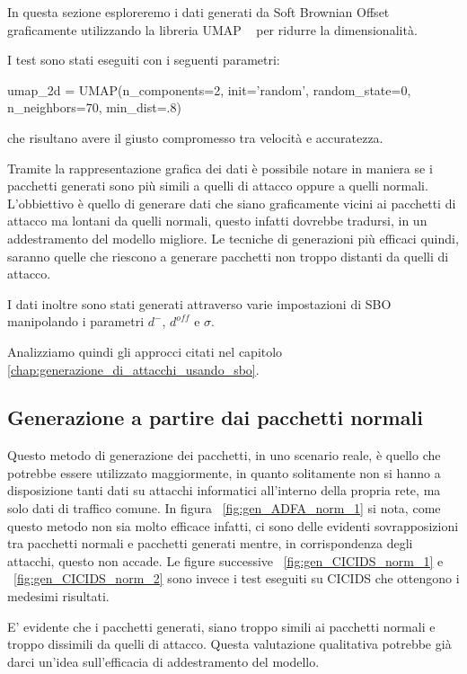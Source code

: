 In questa sezione esploreremo i dati generati da Soft Brownian Offset graficamente utilizzando la libreria UMAP ~\cite{umap} per ridurre la dimensionalità. 

I test sono stati eseguiti con i seguenti parametri:

\begin{python}
umap_2d = UMAP(n_components=2, init='random', random_state=0,
               n_neighbors=70, min_dist=.8)
\end{python}

che risultano avere il giusto compromesso tra velocità e accuratezza.

Tramite la rappresentazione grafica dei dati è possibile notare in maniera se i pacchetti generati sono più simili a quelli di attacco oppure a quelli normali. L'obbiettivo è quello di generare dati che siano graficamente vicini ai pacchetti di attacco ma lontani da quelli normali, questo infatti dovrebbe tradursi, in un addestramento del modello migliore. Le tecniche di generazioni più efficaci quindi, saranno quelle che riescono a generare pacchetti non troppo distanti da quelli di attacco.

I dati inoltre sono stati generati attraverso varie impostazioni di SBO manipolando i parametri $d^{-}$, $d^{off}$ e $\sigma$.

Analizziamo quindi gli approcci citati nel capitolo \ref{chap:generazione_di_attacchi_usando_sbo}.

\subsection{Generazione a partire dai pacchetti normali}

Questo metodo di generazione dei pacchetti, in uno scenario reale, è quello che potrebbe essere utilizzato maggiormente, in quanto solitamente non si hanno a disposizione tanti dati su attacchi informatici all'interno della propria rete, ma solo dati di traffico comune. In figura ~\ref{fig:gen_ADFA_norm_1} si nota, come questo metodo non sia molto efficace infatti, ci sono delle evidenti sovrapposizioni tra pacchetti normali e pacchetti generati mentre, in corrispondenza degli attacchi, questo non accade. Le figure successive ~\ref{fig:gen_CICIDS_norm_1} e ~\ref{fig:gen_CICIDS_norm_2} sono invece i test eseguiti su CICIDS che ottengono i medesimi risultati.

E' evidente che i pacchetti generati, siano troppo simili ai pacchetti normali e troppo dissimili da quelli di attacco. Questa valutazione qualitativa potrebbe già darci un'idea sull'efficacia di addestramento del modello.

